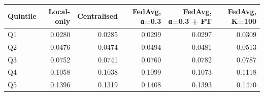 \begin{tabular}{lrrrrr}
\toprule
Quintile & Local-only & Centralised & FedAvg, α=0.3 & FedAvg, α=0.3 + FT & FedAvg, K=100 \\
\midrule
Q1 & 0.0280 & 0.0285 & 0.0299 & 0.0297 & 0.0309 \\
Q2 & 0.0476 & 0.0474 & 0.0494 & 0.0481 & 0.0513 \\
Q3 & 0.0752 & 0.0741 & 0.0760 & 0.0782 & 0.0787 \\
Q4 & 0.1058 & 0.1038 & 0.1099 & 0.1073 & 0.1118 \\
Q5 & 0.1396 & 0.1319 & 0.1408 & 0.1393 & 0.1470 \\
\bottomrule
\end{tabular}
